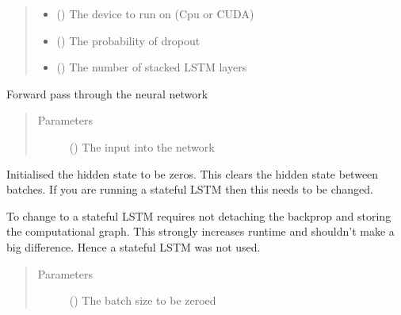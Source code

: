 \documentclass[letterpaper,10pt,english]{sphinxmanual}
\begin{document}
\begin{fulllineitems}
\begin{quote}
\begin{description}
\begin{itemize}
\item {} 
 () \textendash{} The device to run on (Cpu or CUDA)

\item {} 
 () \textendash{} The probability of dropout

\item {} 
 () \textendash{} The number of stacked LSTM layers

\end{itemize}

\end{description}\end{quote}

\begin{fulllineitems}
\label{\detokenize{models:Foresight.models.LSTM_deeper.forward}}
Forward pass through the neural network
\begin{quote}\begin{description}
\item[{Parameters}] \leavevmode
{} () \textendash{} The input into the network

\end{description}\end{quote}

\end{fulllineitems}


\begin{fulllineitems}
\label{\detokenize{models:Foresight.models.LSTM_deeper.init_hidden}}
Initialised the hidden state to be zeros. This clears the hidden
state between batches. If you are running a stateful LSTM then this
needs to be changed.

To change to a stateful LSTM requires not detaching the backprop and
storing the computational graph. This strongly increases runtime and
shouldn’t make a big difference. Hence a stateful LSTM was not used.
\begin{quote}\begin{description}
\item[{Parameters}] \leavevmode
{} () \textendash{} The batch size to be zeroed


\end{description}
\end{quote}
\end{fulllineitems}
\end{fulllineitems}
\end{document}
